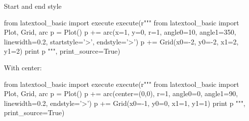 Start and end style
\begin{python}
from latextool_basic import execute
execute(r"""
from latextool_basic import Plot, Grid, arc
p = Plot()
p += arc(x=1, y=0, r=1, angle0=10, angle1=350, 
        linewidth=0.2, startstyle='>', endstyle='>')
p += Grid(x0=-2, y0=-2, x1=2, y1=2)
print p
""", print_source=True)
\end{python}


With center:
\begin{python}
from latextool_basic import execute
execute(r"""
from latextool_basic import Plot, Grid, arc
p = Plot()
p += arc(center=(0,0), r=1, angle0=0, angle1=90, 
        linewidth=0.2, endstyle='>')
p += Grid(x0=-1, y0=0, x1=1, y1=1)
print p
""", print_source=True)
\end{python}
